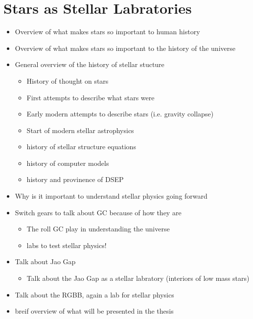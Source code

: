 \chapter{Stars as Stellar Labratories}

\begin{itemize}
  \item Overview of what makes stars so important to human history
  \item Overview of what makes stars so important to the history of the universe 
  \item General overview of the history of stellar stucture
    \begin{itemize}
      \item History of thought on stars
      \item First attempts to describe what stars were
      \item Early modern attempts to describe stars (i.e. gravity collapse)
      \item Start of modern stellar astrophysics
      \item history of stellar structure equations
      \item history of computer models
      \item history and provinence of DSEP
    \end{itemize}
  \item Why is it important to understand stellar physics going forward
  \item Switch gears to talk about GC because of how they are
    \begin{itemize}
      \item The roll GC play in understanding the universe
      \item labs to test stellar physics!
    \end{itemize}
  \item Talk about Jao Gap
    \begin{itemize}
      \item Talk about the Jao Gap as a stellar labratory (interiors of low mass stars)
    \end{itemize}
  \item Talk about the RGBB, again a lab for stellar physics
  \item breif overview of what will be presented in the thesis
\end{itemize}
